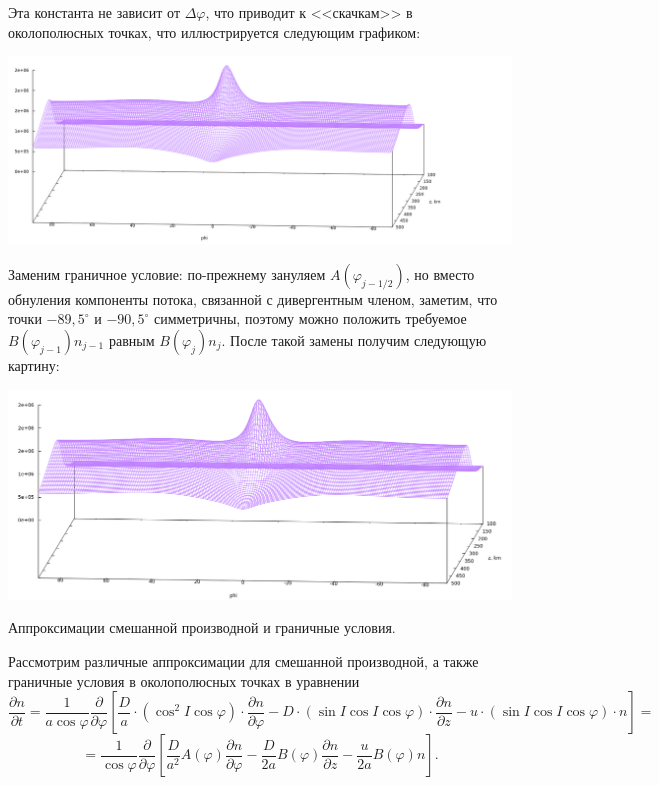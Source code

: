 \documentclass[2pt, a4paper, fleqn]{extarticle}
\begin{document}
Эта константа не зависит от $\Delta\varphi$, что приводит к <<скачкам>> в околополюсных точках, что иллюстрируется следующим графиком:

\includegraphics[scale=0.5]{no_mixed_bad_boundary}

Заменим граничное условие: по-прежнему зануляем $A(\varphi_{j-1/2})$, но вместо обнуления компоненты потока, связанной с дивергентным членом, заметим, что точки $-89{,}5^\circ$ и $-90{,}5^\circ$ симметричны, поэтому можно положить требуемое $B(\varphi_{j-1})n_{j-1}$ равным $B(\varphi_j) n_{j}$. После такой замены получим следующую картину: 

\includegraphics[scale=0.5]{no_mixed_good_boundary}



\begin{center} {\Large Аппроксимации смешанной производной и граничные условия.} \end{center}

Рассмотрим различные аппроксимации для смешанной производной, а также граничные условия в околополюсных точках в уравнении $$\dfrac{\partial n}{\partial t} = \dfrac{1}{a\cos\varphi} \dfrac{\partial }{\partial \varphi}\left[\dfrac{D}{a}\cdot(\cos^2  I \cos\varphi)\cdot\dfrac{\partial n}{\partial \varphi}-D\cdot(\sin I\cos I\cos\varphi)\cdot \dfrac{\partial n}{\partial z} - u\cdot(\sin I \cos I \cos\varphi)\cdot n \right] = $$ $$ =\dfrac{1}{\cos\varphi} \dfrac{\partial }{\partial \varphi}\left[\dfrac{D}{a^2}A(\varphi)\dfrac{\partial n}{\partial \varphi}-\dfrac{D}{2a}B(\varphi) \dfrac{\partial n}{\partial z} - \dfrac{u}{2a}B(\varphi) n \right].$$
\end{document}
